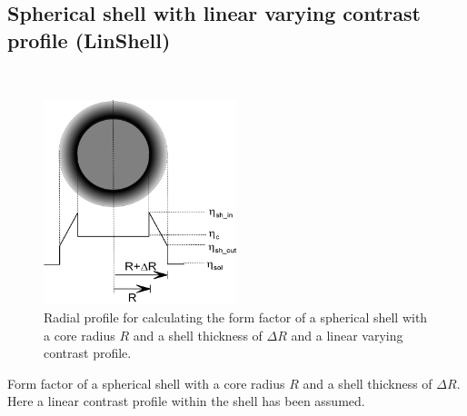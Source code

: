 
\clearpage
\subsection{Spherical shell with linear varying contrast profile (LinShell)}
\label{sect:LinShell} ~\\

\begin{figure}[htb]
\begin{center}
\includegraphics[width=0.5\textwidth,height=0.533\textwidth]{../images/form_factor/spheres/linshell.png}
\end{center}
\caption{Radial profile for calculating the form factor of a spherical shell with a core radius $R$
and a shell thickness of $\Delta R$ and a linear varying contrast
profile.} \label{LinShell1Profile}
\end{figure}

Form factor of a spherical shell with a core radius $R$ and a
shell thickness of $\Delta R$. Here a linear contrast profile
within the shell has been assumed.

